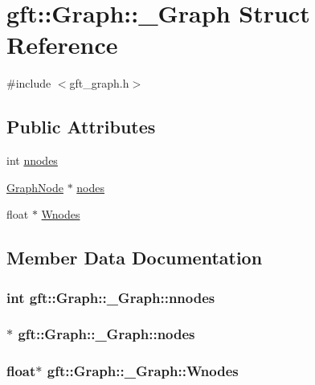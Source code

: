 \hypertarget{structgft_1_1Graph_1_1__Graph}{\section{gft\-:\-:Graph\-:\-:\-\_\-\-Graph Struct Reference}
\label{structgft_1_1Graph_1_1__Graph}
}


{\ttfamily \#include $<$gft\-\_\-graph.\-h$>$}

\subsection*{Public Attributes}
\begin{DoxyCompactItemize}
\item 
int \hyperlink{structgft_1_1Graph_1_1__Graph_a3504f771eee3a7b3ef21651a336bb015}{nnodes}
\item 
\hyperlink{namespacegft_1_1Graph_a86c9c9e21a6c7f4770150ec13209cd89}{Graph\-Node} $\ast$ \hyperlink{structgft_1_1Graph_1_1__Graph_a13d1ded7d408ffe0fa891ed8cee4cc2d}{nodes}
\item 
float $\ast$ \hyperlink{structgft_1_1Graph_1_1__Graph_a29e11a5a0bf7eb3095a7638467eaf4ed}{Wnodes}
\end{DoxyCompactItemize}


\subsection{Member Data Documentation}
\hypertarget{structgft_1_1Graph_1_1__Graph_a3504f771eee3a7b3ef21651a336bb015}{
\subsubsection[{nnodes}]{\setlength{\rightskip}{0pt plus 5cm}int gft\-::\-Graph\-::\-\_\-\-Graph\-::nnodes}}\label{structgft_1_1Graph_1_1__Graph_a3504f771eee3a7b3ef21651a336bb015}
\hypertarget{structgft_1_1Graph_1_1__Graph_a13d1ded7d408ffe0fa891ed8cee4cc2d}{
\subsubsection[{nodes}]{$\ast$ gft\-::\-Graph\-::\-\_\-\-Graph\-::nodes}}\label{structgft_1_1Graph_1_1__Graph_a13d1ded7d408ffe0fa891ed8cee4cc2d}
\hypertarget{structgft_1_1Graph_1_1__Graph_a29e11a5a0bf7eb3095a7638467eaf4ed}{
\subsubsection[{Wnodes}]{\setlength{\rightskip}{0pt plus 5cm}float$\ast$ gft\-::\-Graph\-::\-\_\-\-Graph\-::\-Wnodes}}\label{structgft_1_1Graph_1_1__Graph_a29e11a5a0bf7eb3095a7638467eaf4ed}


